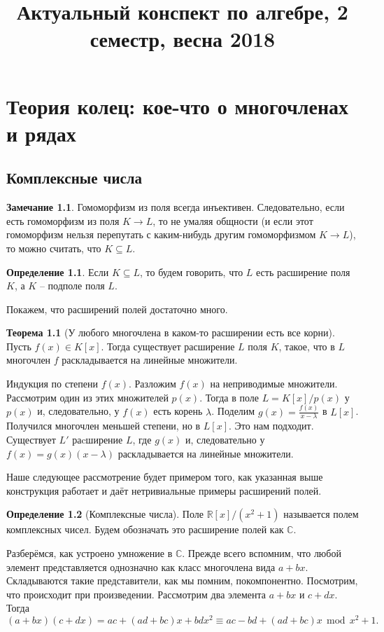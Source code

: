 \documentclass[10pt,a4paper,oneside]{book} %
\theoremstyle{definition}
\newtheorem*{rem}{Замечание}
\newtheorem*{defn}{Определение}
\newtheorem{thm}{Теорема}
\renewcommand{\mod}{\,\operatorname{mod}\,}
\newcommand{\mb}[1]{\mathbb{#1}}
\def\thrm{\begin{thm}}
\def\ethrm{\end{thm}}
\def\dfn{\begin{defn}}
\def\edfn{\end{defn}}
\def\rm{\begin{rem}}
\def\erm{\end{rem}}
\begin{document}
\title{Актуальный конспект по алгебре, 2 семестр, весна 2018}
\date{}
\author{}
\maketitle
\tableofcontents

\setcounter{chapter}{1}

\chapter{Теория колец: кое-что о многочленах и рядах}

\section{Комплексные числа}
\rm Гомоморфизм из поля всегда инъективен. Следовательно, если есть гомоморфизм из поля $K\to L$, то не умаляя общности (и если этот гомоморфизм нельзя перепутать с каким-нибудь другим гомоморфизмом $K\to L$), то можно считать, что $K\subseteq L$.
\erm

\dfn Если $K\subseteq L$, то будем говорить, что $L$ есть расширение поля $K$, а $K$ -- подполе поля $L$.
\edfn
Покажем, что расширений полей достаточно много.
\thrm[У любого многочлена в каком-то расширении есть все корни] Пусть $f(x)\in K[x]$. Тогда существует расширение $L$ поля $K$, такое, что в $L$ многочлен $f$ раскладывается на линейные множители.  
\ethrm
\proof Индукция по степени $f(x)$. Разложим $f(x)$ на неприводимые множители. Рассмотрим один из этих множителей $p(x)$. Тогда в поле $L=K[x]/p(x)$ у $p(x)$ и, следовательно, у $f(x)$ есть корень $\lambda$. Поделим $g(x)=\frac{f(x)}{x-\lambda}$ в $L[x]$. Получился многочлен меньшей степени, но в $L[x]$. Это нам подходит. Существует $L'$ раcширение $L$, где  $g(x)$ и, следовательно у $f(x)=g(x)(x-\lambda)$ раскладывается на линейные множители.
\endproof

Наше следующее рассмотрение будет примером того, как указанная выше конструкция работает и даёт нетривиальные примеры расширений полей. 

\dfn[Комплексные числа] Поле $\mb R[x]/(x^2 + 1)$ называется полем комплексных чисел. Будем обозначать это расширение полей как $\mb C$.
\edfn

Разберёмся, как устроено умножение в $\mb C$. Прежде всего вспомним, что любой элемент представляется однозначно как класс многочлена вида $a+bx$. Складываются такие представители, как мы помним, покомпонентно. Посмотрим, что происходит при произведении. Рассмотрим два элемента $a+bx$ и $c+dx$. Тогда
$$(a+bx)(c+dx)=ac+(ad+bc)x+bdx^2\equiv ac-bd + (ad+bc)x \mod x^2+1.$$
\end{document}
